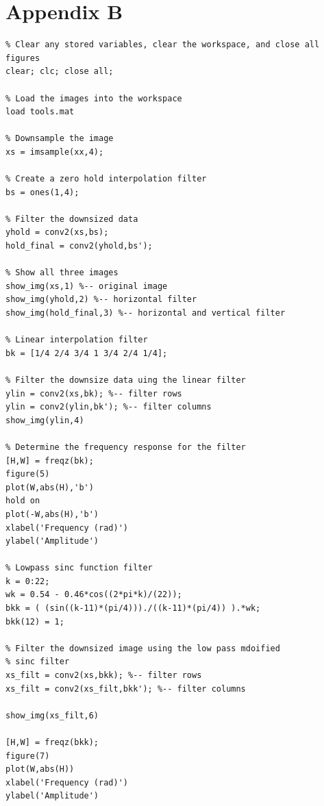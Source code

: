 \documentclass{article}
\begin{document}
\section{Appendix B}
\begin{lstlisting}
% Clear any stored variables, clear the workspace, and close all figures
clear; clc; close all;

% Load the images into the workspace
load tools.mat

% Downsample the image
xs = imsample(xx,4);

% Create a zero hold interpolation filter
bs = ones(1,4);

% Filter the downsized data
yhold = conv2(xs,bs);
hold_final = conv2(yhold,bs');

% Show all three images
show_img(xs,1) %-- original image
show_img(yhold,2) %-- horizontal filter
show_img(hold_final,3) %-- horizontal and vertical filter

% Linear interpolation filter
bk = [1/4 2/4 3/4 1 3/4 2/4 1/4];

% Filter the downsize data uing the linear filter
ylin = conv2(xs,bk); %-- filter rows
ylin = conv2(ylin,bk'); %-- filter columns
show_img(ylin,4)

% Determine the frequency response for the filter
[H,W] = freqz(bk);
figure(5)
plot(W,abs(H),'b')
hold on
plot(-W,abs(H),'b')
xlabel('Frequency (rad)')
ylabel('Amplitude')

% Lowpass sinc function filter
k = 0:22;
wk = 0.54 - 0.46*cos((2*pi*k)/(22));
bkk = ( (sin((k-11)*(pi/4)))./((k-11)*(pi/4)) ).*wk;
bkk(12) = 1;

% Filter the downsized image using the low pass mdoified
% sinc filter
xs_filt = conv2(xs,bkk); %-- filter rows
xs_filt = conv2(xs_filt,bkk'); %-- filter columns

show_img(xs_filt,6)

[H,W] = freqz(bkk);
figure(7)
plot(W,abs(H))
xlabel('Frequency (rad)')
ylabel('Amplitude')
\end{lstlisting}

\newpage
\end{document}
